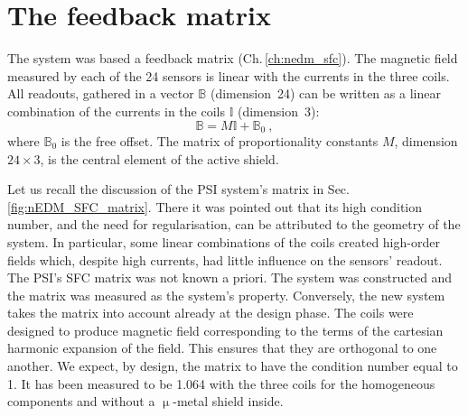 \section{The feedback matrix}
The system was based a feedback matrix (Ch.\,\ref{ch:nedm_sfc}). The magnetic field measured by each of the 24 sensors is linear with the currents in the three coils. All readouts, gathered in a vector $\mathbb{B}$ (dimension~24) can be written as a linear combination of the currents in the coils $\mathbb{I}$ (dimension~3):
\begin{equation}
  \label{eq:SFC_matrix_model}
  \mathbb{B} = M \mathbb{I} + \mathbb{B}_0 \ ,
\end{equation}
where $\mathbb{B}_0$ is the free offset. The matrix of proportionality constants $M$, dimension $24 \times 3$, is the central element of the active shield.

Let us recall the discussion of the PSI system's matrix in Sec.\,\ref{fig:nEDM_SFC_matrix}. There it was pointed out that its high condition number, and the need for regularisation, can be attributed to the geometry of the system. In particular, some linear combinations of the coils created high-order fields which, despite high currents, had little influence on the sensors' readout.
The PSI's SFC matrix was not known a priori. The system was constructed and the matrix was measured as the system's property.
Conversely, the new system takes the matrix into account already at the design phase. The coils were designed to produce magnetic field corresponding to the terms of the cartesian harmonic expansion of the field.
This ensures that they are orthogonal to one another. We expect, by design, the matrix to have the condition number equal to \num{1}. It has been measured to be \num{1.064} with the three coils for the homogeneous components and without a $\upmu$-metal shield inside.


